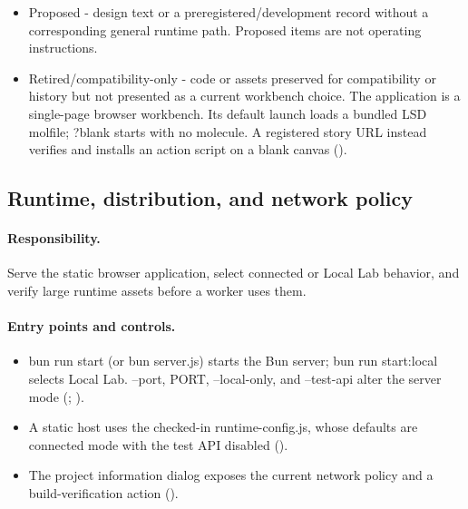 \documentclass[11pt]{article}
\begin{document}
\begin{small}
\begin{itemize}[leftmargin=*]
\item Proposed - design text or a preregistered/development record without a corresponding general runtime path. Proposed items are not operating instructions.

\item Retired/compatibility-only - code or assets preserved for compatibility or history but not presented as a current workbench choice. The application is a single-page browser workbench. Its default launch loads a bundled LSD molfile; ?blank starts with no molecule. A registered story URL instead verifies and installs an action script on a blank canvas ().

\end{itemize}

\subsection{Runtime, distribution, and network policy}\label{appB:sec2}

\paragraph{Responsibility.}

Serve the static browser application, select connected or Local Lab behavior, and verify large runtime assets before a worker uses them.

\paragraph{Entry points and controls.}

\begin{itemize}[leftmargin=*]

\item bun run start (or bun server.js) starts the Bun server; bun run start:local selects Local Lab. --port, PORT, --local-only, and --test-api alter the server mode (; ).

\item A static host uses the checked-in runtime-config.js, whose defaults are connected mode with the test API disabled ().

\item The project information dialog exposes the current network policy and a build-verification action ().

\end{itemize}


\end{small}
\end{document}
